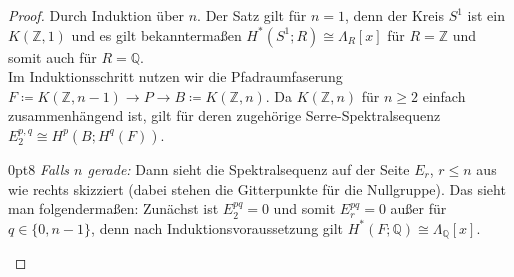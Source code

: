 \documentclass[11pt, a4paper, german]{article}
\theoremstyle{definition}
\theoremstyle{remark}
\newcommand{\Z}{\mathbb{Z}} %
\newcommand{\Q}{\mathbb{Q}} %
\newcommand{\zeroDot}[2]{\node[draw,circle,inner sep=0.4pt,fill] at (#1,#2) {};} %
\begin{document}
\begin{proof}
  Durch Induktion über $n$.
  Der Satz gilt für $n = 1$, denn der Kreis $S^1$ ist ein $K(\Z, 1)$ und es gilt bekanntermaßen $H^*(S^1; R) \cong \Lambda_R[x]$ für $R = \Z$ und somit auch für $R = \Q$. \\
  Im Induktionsschritt nutzen wir die Pfadraumfaserung $F \coloneqq K(\Z, n{-}1) \to P \to B \coloneqq K(\Z, n)$. Da $K(\Z, n)$ für $n \geq 2$ einfach zusammenhängend ist, gilt für deren zugehörige Serre-Spektralsequenz
  $E_2^{p,q} \cong H^p(B; H^q(F))$.

  \vspace{0.5cm}

  \renewcommand\windowpagestuff{
    \begin{center}\begin{tikzpicture}[x=16pt,y=16pt]\begin{scope}[shift={(0,0)}]
      \foreach \x in {1,2,3,5,6,7}{
        \foreach \y in {0,1,...,3}{
          \zeroDot{\x}{\y}
        }
      }
      \foreach \x in {0,...,8}{
        \zeroDot{\x}{4}
      }
      \foreach \y in {0,...,4}{
        \node at (9.5,\y) {$\cdots$};
      }
      \node at (0,0) {$\Q$\small $1$};
      \zeroDot{0}{1}
      \zeroDot{0}{2}
      \node at (0,3) {$\Q$\small $a$};
      \node at (4,0) {$\Q$\small $x$};
      \zeroDot{4}{1}
      \zeroDot{4}{2}
      \node at (4,3) {$\Q$\small $ax$};
      \draw[->,gray] (0.6,2.6) -- (3.4,0.4);
      \node at (8,0) {$\Q$\small $x^2$};
      \zeroDot{8}{1}
      \zeroDot{8}{2}
      \node at (8,3) {$\Q$\small $ax^2$};
      \draw[->,gray] (4.6,2.6) -- (7.4,0.4);
      \draw[->] (-0.7,-0.6) -- (10.3,-0.6); %
      \draw[->] (-0.7,-0.6) -- (-0.7,4.5); %
      \node[left] at (-0.7,0) {$0$};
      \node[left] at (-0.9,1.7) {\vdots};
      \node[left] at (-0.7,3) {$n{-}1$};
      \node[below] at (0,-0.6) {$0$};
      \node[below] at (2,-0.7) {$\cdots$};
      \node[below] at (4,-0.7) {$n$};
      \node[below] at (6,-0.7) {$\cdots$};
      \node[below] at (8,-0.6) {$2n$};
      \node[below] at (9.5,-0.7) {$\cdots$};
    \end{scope}\end{tikzpicture}\end{center}
  }
  \opencutright
  \begin{cutout}{0}{\dimexpr\linewidth-8cm\relax}{0pt}{8}
    \emph{Falls $n$ gerade:} \enspace
    Dann sieht die Spektralsequenz auf der Seite $E_r$, $r \leq n$ aus wie rechts skizziert (dabei stehen die Gitterpunkte für die Nullgruppe).
    Das sieht man folgendermaßen: Zunächst ist $E_2^{pq} = 0$ und somit $E_r^{pq} = 0$ außer für $q \in \{ 0, n{-}1 \}$, denn nach Induktionsvoraussetzung gilt $H^*(F; \Q) \cong \Lambda_\Q[x]$.

\end{cutout}
\end{proof}
\end{document}
